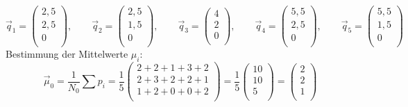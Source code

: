 \documentclass{article}
\begin{document}
\[
\vec{q}_1 =
\left(
\begin {array} {c}

2,5 \\

2,5 \\

0 \\

\end {array}
\right)
, \qquad
\vec{q}_2 =
\left(
\begin {array} {c}

2,5 \\

1,5 \\

0 \\

\end {array}
\right)
, \qquad
\vec{q}_3 =
\left(
\begin {array} {c}

4 \\

2 \\

0 \\

\end {array}
\right)
, \qquad
\vec{q}_4 =
\left(
\begin {array} {c}

5,5 \\

2,5 \\

0 \\

\end {array}
\right)
, \qquad
\vec{q}_5 =
\left(
\begin {array} {c}

5,5 \\

1,5 \\

0 \\

\end {array}
\right)
\]
Bestimmung der Mittelwerte $\mu_i$:
\[
\vec{\mu}_0 = \frac{1}{N_0} \sum{p_i} = \frac{1}{5}
\left(
\begin {array} {c}
2 + 2 + 1 + 3 + 2 \\
2 + 3 + 2 + 2 + 1 \\
1 + 2 + 0 + 0 + 2 \\
\end{array}
\right)
= \frac{1}{5}
\left(
\begin {array} {c}
10 \\
10 \\
5 \\
\end {array}
\right)
=
\left(
\begin {array} {c}
2 \\
2 \\
1 \\
\end {array}
\right)
\]
\end{document}
